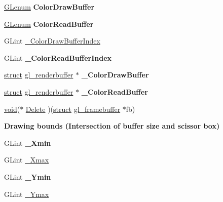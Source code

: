 \begin{DoxyCompactItemize}
\mbox{\label{structgl__framebuffer_ab166abe3896c67c94e58ffed70b68e5c}} 
\hyperlink{interfacevoid}{G\+Lenum} {\bfseries Color\+Draw\+Buffer}
\item 
\mbox{\label{structgl__framebuffer_aee49376d43bd6e0bdd93bb7ef8fdfabf}} 
\hyperlink{interfacevoid}{G\+Lenum} {\bfseries Color\+Read\+Buffer}
\item 
G\+Lint \hyperlink{structgl__framebuffer_ac33c52ba1acfaf662daaea2e38083321}{\+\_\+\+Color\+Draw\+Buffer\+Index}
\item 
\mbox{\label{structgl__framebuffer_a0b0734e2bcec60dbf3615147e40acb30}} 
G\+Lint {\bfseries \+\_\+\+Color\+Read\+Buffer\+Index}
\item 
\mbox{\label{structgl__framebuffer_ab87f875784b11e8c2f4562c9e3dc8a54}} 
\hyperlink{interfacestruct}{struct} \hyperlink{structgl__renderbuffer}{gl\+\_\+renderbuffer} $\ast$ {\bfseries \+\_\+\+Color\+Draw\+Buffer}
\item 
\mbox{\label{structgl__framebuffer_a19f8b2c0ab47db3974dcf153e1fc7829}} 
\hyperlink{interfacestruct}{struct} \hyperlink{structgl__renderbuffer}{gl\+\_\+renderbuffer} $\ast$ {\bfseries \+\_\+\+Color\+Read\+Buffer}
\item 
\hyperlink{interfacevoid}{void}($\ast$ \hyperlink{structgl__framebuffer_a179b9f40b107c71d68a7d5eb47124cc8}{Delete} )(\hyperlink{interfacestruct}{struct} \hyperlink{structgl__framebuffer}{gl\+\_\+framebuffer} $\ast$fb)
\end{DoxyCompactItemize}
\begin{Indent}\textbf{ Drawing bounds (Intersection of buffer size and scissor box)}\par
\begin{DoxyCompactItemize}
\item 
\mbox{\label{structgl__framebuffer_a827af14a59579803c1cfb4b8ab9d8708}} 
G\+Lint {\bfseries \+\_\+\+Xmin}
\item 
G\+Lint \hyperlink{structgl__framebuffer_a2d9b54e2cfd522578aeb99518fea21b0}{\+\_\+\+Xmax}
\item 
\mbox{\label{structgl__framebuffer_aee9484863837f7048d16700ad2b85f33}} 
G\+Lint {\bfseries \+\_\+\+Ymin}
\item 
G\+Lint \hyperlink{structgl__framebuffer_a852cee35ad38c0dd3036a754cfb80810}{\+\_\+\+Ymax}
\end{DoxyCompactItemize}
\end{Indent}

